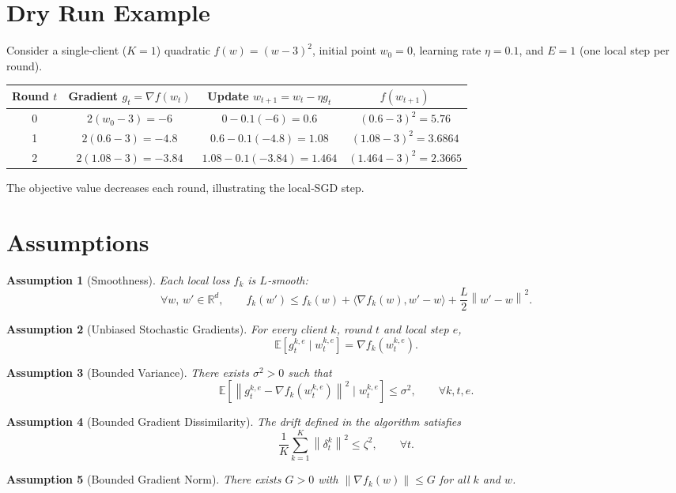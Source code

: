 \documentclass{article}
\newtheorem{assumption}{Assumption}
\newcommand{\E}{\mathbb{E}}
\newcommand{\norm}[1]{\left\|#1\right\|}
\newcommand{\ip}[2]{\langle #1,#2\rangle}
\begin{document}
\section*{Dry Run Example}
Consider a single‑client ($K=1$) quadratic $f(w)=(w-3)^2$, initial point $w_0=0$, learning rate $\eta=0.1$, and $E=1$ (one local step per round).

\begin{tabular}{c|c|c|c}
Round $t$ & Gradient $g_t=\nabla f(w_t)$ & Update $w_{t+1}=w_t-\eta g_t$ & $f(w_{t+1})$\\\hline
0 & $2(w_0-3) = -6$ & $0-0.1(-6)=0.6$ & $(0.6-3)^2=5.76$\\
1 & $2(0.6-3) = -4.8$ & $0.6-0.1(-4.8)=1.08$ & $(1.08-3)^2=3.6864$\\
2 & $2(1.08-3) = -3.84$ & $1.08-0.1(-3.84)=1.464$ & $(1.464-3)^2=2.3665$\\
\end{tabular}

The objective value decreases each round, illustrating the local‑SGD step.

\newpage

\section*{Assumptions}
\begin{assumption}[Smoothness]\label{as:smooth}
Each local loss $f_k$ is $L$‑smooth:
\[
    \forall w,\,w'\in\mathbb{R}^d,\qquad 
    f_k(w')\le f_k(w)+\ip{\nabla f_k(w)}{w'-w}+\frac{L}{2}\norm{w'-w}^2 .
\]
\end{assumption}
\begin{assumption}[Unbiased Stochastic Gradients]\label{as:unbiased}
For every client $k$, round $t$ and local step $e$,
\[
    \E\!\left[g_{t}^{k,e}\mid w_{t}^{k,e}\right]=\nabla f_k\!\left(w_{t}^{k,e}\right).
\]
\end{assumption}
\begin{assumption}[Bounded Variance]\label{as:variance}
There exists $\sigma^2>0$ such that
\[
    \E\!\left[\norm{g_{t}^{k,e}-\nabla f_k(w_{t}^{k,e})}^2\mid w_{t}^{k,e}\right]\le\sigma^2,
    \qquad\forall k,t,e .
\]
\end{assumption}
\begin{assumption}[Bounded Gradient Dissimilarity]\label{as:dissimilarity}
The drift defined in the algorithm satisfies
\[
    \frac{1}{K}\sum_{k=1}^{K}\norm{\delta_{t}^{k}}^2\le \zeta^2,
    \qquad\forall t .
\]
\end{assumption}
\begin{assumption}[Bounded Gradient Norm]\label{as:boundedgrad}
There exists $G>0$ with $\norm{\nabla f_k(w)}\le G$ for all $k$ and $w$.
\end{assumption}
\end{document}
